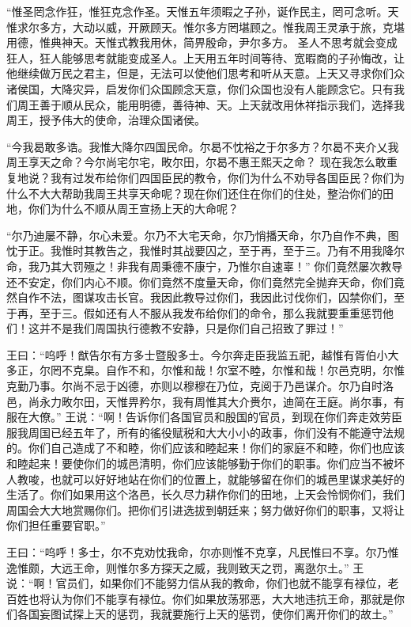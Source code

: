 \documentclass[12pt,UTF8]{ctexbook}
\begin{document}
“惟圣罔念作狂，惟狂克念作圣。天惟五年须暇之子孙，诞作民主，罔可念听。天惟求尔多方，大动以威，开厥顾天。惟尔多方罔堪顾之。惟我周王灵承于旅，克堪用德，惟典神天。天惟式教我用休，简畀殷命，尹尔多方。
圣人不思考就会变成狂人，狂人能够思考就能变成圣人。上天用五年时间等待、宽暇商的子孙悔改，让他继续做万民之君主，但是，无法可以使他们思考和听从天意。上天又寻求你们众诸侯国，大降灾异，启发你们众国顾念天意，你们众国也没有人能顾念它。只有我们周王善于顺从民众，能用明德，善待神、天。上天就改用休祥指示我们，选择我周王，授予伟大的使命，治理众国诸侯。

“今我曷敢多诰。我惟大降尔四国民命。尔曷不忱裕之于尔多方？尔曷不夹介乂我周王享天之命？今尔尚宅尔宅，畋尔田，尔曷不惠王熙天之命？
现在我怎么敢重复地说？我有过发布给你们四国臣民的教令，你们为什么不劝导各国臣民？你们为什么不大大帮助我周王共享天命呢？现在你们还住在你们的住处，整治你们的田地，你们为什么不顺从周王宣扬上天的大命呢？

“尔乃迪屡不静，尔心未爱。尔乃不大宅天命，尔乃悄播天命，尔乃自作不典，图忱于正。我惟时其教告之，我惟时其战要囚之，至于再，至于三。乃有不用我降尔命，我乃其大罚殛之！非我有周秉德不康宁，乃惟尔自速辜！”
你们竟然屡次教导还不安定，你们内心不顺。你们竟然不度量天命，你们竟然完全抛弃天命，你们竟然自作不法，图谋攻击长官。我因此教导过你们，我因此讨伐你们，囚禁你们，至于再，至于三。假如还有人不服从我发布给你们的命令，那么我就要重重惩罚他们！这并不是我们周国执行德教不安静，只是你们自己招致了罪过！”

王曰：“呜呼！猷告尔有方多士暨殷多士。今尔奔走臣我监五祀，越惟有胥伯小大多正，尔罔不克臬。自作不和，尔惟和哉！尔室不睦，尔惟和哉！尔邑克明，尔惟克勤乃事。尔尚不忌于凶德，亦则以穆穆在乃位，克阅于乃邑谋介。尔乃自时洛邑，尚永力畋尔田，天惟畀矜尔，我有周惟其大介赉尔，迪简在王庭。尚尔事，有服在大僚。”
王说：“啊！告诉你们各国官员和殷国的官员，到现在你们奔走效劳臣服我周国已经五年了，所有的徭役赋税和大大小小的政事，你们没有不能遵守法规的。你们自己造成了不和睦，你们应该和睦起来！你们的家庭不和睦，你们也应该和睦起来！要使你们的城邑清明，你们应该能够勤于你们的职事。你们应当不被坏人教唆，也就可以好好地站在你们的位置上，就能够留在你们的城邑里谋求美好的生活了。你们如果用这个洛邑，长久尽力耕作你们的田地，上天会怜悯你们，我们周国会大大地赏赐你们。把你们引进选拔到朝廷来；努力做好你们的职事，又将让你们担任重要官职。”

王曰：“呜呼！多士，尔不克劝忱我命，尔亦则惟不克享，凡民惟曰不享。尔乃惟逸惟颇，大远王命，则惟尔多方探天之威，我则致天之罚，离逖尔土。”
王说：“啊！官员们，如果你们不能努力信从我的教命，你们也就不能享有禄位，老百姓也将认为你们不能享有禄位。你们如果放荡邪恶，大大地违抗王命，那就是你们各国妄图试探上天的惩罚，我就要施行上天的惩罚，使你们离开你们的故土。”
\end{document}
